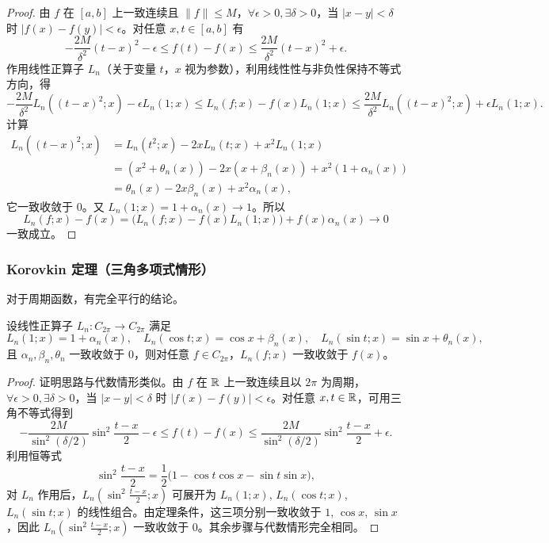 \begin{proof}
由 $f$ 在 $[a,b]$ 上一致连续且 $\|f\|\le M$，$\forall \epsilon>0,\exists\delta>0$，当 $|x-y|<\delta$ 时 $|f(x)-f(y)|<\epsilon$。对任意 $x,t\in[a,b]$ 有
\[
-\frac{2M}{\delta^2}(t-x)^2 - \epsilon \le f(t)-f(x) \le \frac{2M}{\delta^2}(t-x)^2 + \epsilon.
\]
作用线性正算子 $L_n$（关于变量 $t$，$x$ 视为参数），利用线性性与非负性保持不等式方向，得
\[
-\frac{2M}{\delta^2}L_n((t-x)^2;x)-\epsilon L_n(1;x)
\le L_n(f;x)-f(x)L_n(1;x)
\le \frac{2M}{\delta^2}L_n((t-x)^2;x)+\epsilon L_n(1;x).
\]
计算
\begin{align*}
L_n((t-x)^2;x)
&= L_n(t^2;x) - 2xL_n(t;x) + x^2L_n(1;x)\\
&= (x^2+\theta_n(x)) - 2x(x+\beta_n(x)) + x^2(1+\alpha_n(x))\\
&= \theta_n(x) - 2x\beta_n(x) + x^2\alpha_n(x),
\end{align*}
它一致收敛于 $0$。又 $L_n(1;x)=1+\alpha_n(x)\to 1$。所以
\[
L_n(f;x) - f(x) = \big(L_n(f;x)-f(x)L_n(1;x)\big) + f(x)\alpha_n(x) \to 0
\]
一致成立。
\end{proof}

\subsubsection{Korovkin 定理（三角多项式情形）}

对于周期函数，有完全平行的结论。

\begin{theorem}
设线性正算子 $L_n: C_{2\pi}\to C_{2\pi}$ 满足
\[
L_n(1;x)=1+\alpha_n(x),\quad L_n(\cos t;x)=\cos x+\beta_n(x),\quad L_n(\sin t;x)=\sin x+\theta_n(x),
\]
且 $\alpha_n,\beta_n,\theta_n$ 一致收敛于 $0$，则对任意 $f\in C_{2\pi}$，$L_n(f;x)$ 一致收敛于 $f(x)$。
\end{theorem}

\begin{proof}
证明思路与代数情形类似。由 $f$ 在 $\mathbb{R}$ 上一致连续且以 $2\pi$ 为周期，$\forall\epsilon>0,\exists\delta>0$，当 $|x-y|<\delta$ 时 $|f(x)-f(y)|<\epsilon$。对任意 $x,t\in\mathbb{R}$，可用三角不等式得到
\[
-\frac{2M}{\sin^2(\delta/2)}\sin^2\frac{t-x}{2} - \epsilon \le f(t)-f(x) \le \frac{2M}{\sin^2(\delta/2)}\sin^2\frac{t-x}{2} + \epsilon.
\]
利用恒等式
\[
\sin^2\frac{t-x}{2} = \frac{1}{2}\big(1 - \cos t\cos x - \sin t\sin x\big),
\]
对 $L_n$ 作用后，$L_n(\sin^2\frac{t-x}{2};x)$ 可展开为 $L_n(1;x)$, $L_n(\cos t;x)$, $L_n(\sin t;x)$ 的线性组合。由定理条件，这三项分别一致收敛于 $1$, $\cos x$, $\sin x$，因此 $L_n(\sin^2\frac{t-x}{2};x)$ 一致收敛于 $0$。其余步骤与代数情形完全相同。
\end{proof}

